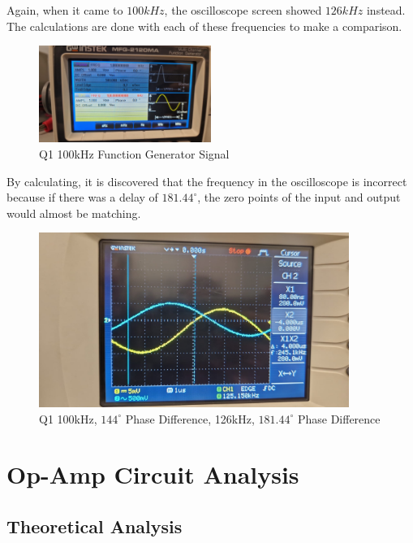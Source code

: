 Again, when it came to $100kHz$, the oscilloscope screen showed $126kHz$ instead. The calculations are done with each of these frequencies to make a comparison.

\begin{figure}[h]
    \centering
    \includegraphics[width=0.5\textwidth]{assets/exp/q1-100kHz-1vpp-signal.jpeg}
    \caption{Q1 100kHz Function Generator Signal}
    \label{fig:q1-100kHz-1vpp-signal}
\end{figure}

\newpage
\thispagestyle{plain}

By calculating, it is discovered that the frequency in the oscilloscope is incorrect because if there was a delay of $181.44^{\circ}$, the zero points of the input and output would almost be matching.
\begin{figure}[h]
    \centering
    \includegraphics[width=0.9\textwidth]{assets/exp/q1-100kHz-1vpp-phase.jpeg}
    \caption{Q1 100kHz, $144^{\circ}$ Phase Difference, 126kHz, $181.44^{\circ}$ Phase Difference}
    \label{fig:q1-100kHz-1vpp-phase}
\end{figure}


\newpage
\thispagestyle{plain}

\section{Op-Amp Circuit Analysis}

\subsection{Theoretical Analysis}

